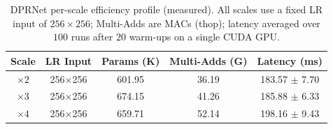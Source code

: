 \begin{table}[H]
\centering
\caption{DPRNet per-scale efficiency profile (measured). All scales use a fixed LR input of
$256\times256$; Multi-Adds are MACs (thop); latency averaged over $100$ runs after $20$ warm-ups on a
single CUDA GPU.}
\label{tab:efficiency_profile}
\begingroup
\scriptsize
\setlength{\tabcolsep}{3pt}
\renewcommand{\arraystretch}{1.05}
\begin{tabular*}{\columnwidth}{@{\extracolsep{\fill}}ccccc}
\toprule
Scale & LR Input & Params (K) & Multi-Adds (G) & Latency (ms) \\
\midrule
$\times 2$ & 256$\times$256 & 601.95 & 36.19 & 183.57 $\pm$ 7.70 \\
$\times 3$ & 256$\times$256 & 674.15 & 41.26 & 185.88 $\pm$ 6.33 \\
$\times 4$ & 256$\times$256 & 659.71 & 52.14 & 198.16 $\pm$ 9.43 \\
\bottomrule
\end{tabular*}
\endgroup
\end{table}
